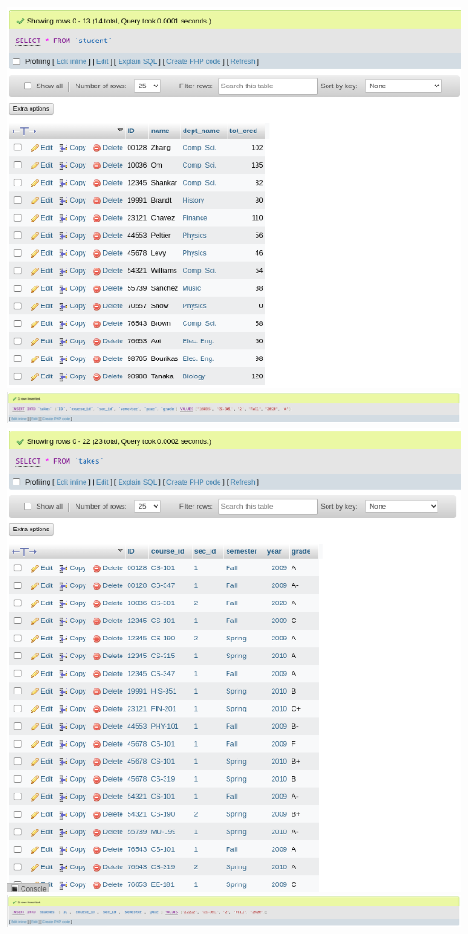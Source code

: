 \documentclass{article}
\begin{document}
\begin{center}
    \includegraphics[scale=0.5]{7-8s.png}
    \newpage
    \includegraphics[scale=0.5]{7-9i.png}
    \includegraphics[scale=0.5]{7-9s.png}
    \newpage
    \includegraphics[scale=0.5]{7-10i.png}

\end{center}
\end{document}
